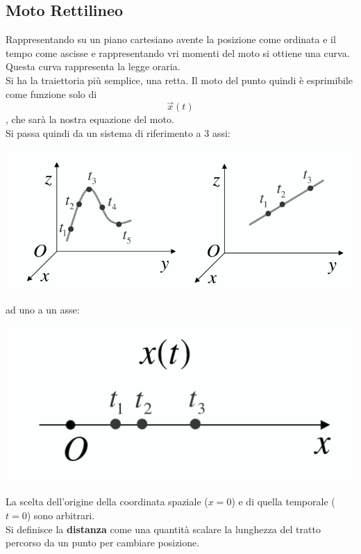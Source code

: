 \documentclass[a4paper,12pt, oneside]{book}
\begin{document}
\subsection{Moto Rettilineo}
Rappresentando su un piano cartesiano avente la posizione come ordinata e il tempo come ascisse e rappresentando vri momenti del moto si ottiene una curva. Questa curva rappresenta la legge oraria.\\
Si ha la traiettoria più semplice, una retta. Il moto del punto quindi è esprimibile come funzione solo di $$\vec{x}(t)$$, che sarà la nostra equazione del moto.\\
Si passa quindi da un sistema di riferimento a 3 assi:
\begin{center}
\includegraphics[scale=0.5]{img/rett.png}
\end{center}
ad uno a un asse:
\begin{center}
\includegraphics[scale=0.3]{img/ret2.png}
\end{center}
La scelta dell'origine della coordinata spaziale ($x=0$) e di quella temporale ($t=0$) sono arbitrari.\\
Si definisce la \textbf{distanza} come una quantità scalare la lunghezza del tratto percorso da un punto per cambiare posizione.
\end{document}
